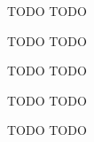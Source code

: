 \documentclass{article}
\begin{document}
\newpage
{} TODO \tri
\hop
\solution
TODO


\newpage
{} TODO \tri
\hop
\solution
TODO


\newpage
{} TODO \tri
\hop
\solution
TODO


\newpage
{} TODO \tri
\hop
\solution
TODO


\newpage
{} TODO \tri
\hop
\solution
TODO
\end{document}
